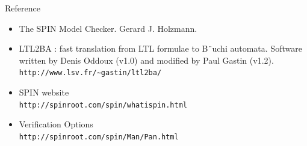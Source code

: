 \documentclass[12pt]{beamer}
\newcommand{\code}[1]{\texttt{#1}}
\begin{document}
\begin{frame}{Reference}
\begin{itemize}
	\item The SPIN Model Checker. Gerard J. Holzmann.
	\item LTL2BA : fast translation from LTL formulae to B¨uchi automata. Software written by Denis
Oddoux (v1.0) and modified by Paul Gastin (v1.2).\\
		\code{http://www.lsv.fr/∼gastin/ltl2ba/}
	\item SPIN website\\
		\code{http://spinroot.com/spin/whatispin.html
}
	\item Verification Options\\
		\code{http://spinroot.com/spin/Man/Pan.html
}
\end{itemize}
\end{frame}
\end{document}
